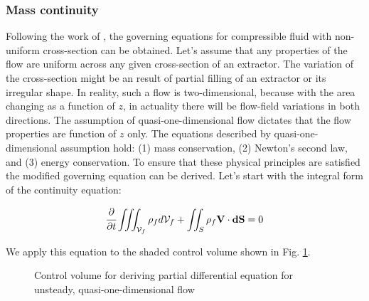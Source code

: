 \documentclass[../Article_Model_Parameters.tex]{subfiles}
\begin{document}
	
	\label{CH: Gouverning equations}
	
	\subsubsection{Mass continuity}

	Following the work of \citet{Anderson1995}, the governing equations for compressible fluid with non-uniform cross-section can be obtained. Let's assume that any properties of the flow are uniform across any given cross-section of an extractor. The variation of the cross-section might be an result of partial filling of an extractor or its irregular shape. In reality, such a flow is two-dimensional, because with the area changing as a function of $z$, in actuality there will be flow-field variations in both directions. The assumption of quasi-one-dimensional flow dictates that the flow properties are function of $z$ only. The equations described by quasi-one-dimensional assumption hold: (1) mass conservation, (2) Newton's second law, and (3) energy conservation. To ensure that these physical principles are satisfied the modified governing equation can be derived.	Let's start with the integral form of the continuity equation:
	
	{\footnotesize
		\begin{equation}
			\cfrac{\partial}{\partial t} \iiint_{\mathcal{V}_f} \rho_f d\mathcal{V}_f + \iint_S \rho_f \textbf{V} \cdot \textbf{dS} = 0
			\label{EQ: Continuity_integral_general}
		\end{equation}
	}
	
	We apply this equation to the shaded control volume shown in Fig. \ref{fig: control_volume}. 
	
	\begin{figure}[h]
		\centering
		\caption{Control volume for deriving partial differential equation for unsteady, quasi-one-dimensional flow}
		\label{fig: control_volume}
	\end{figure}
	
\end{document}
